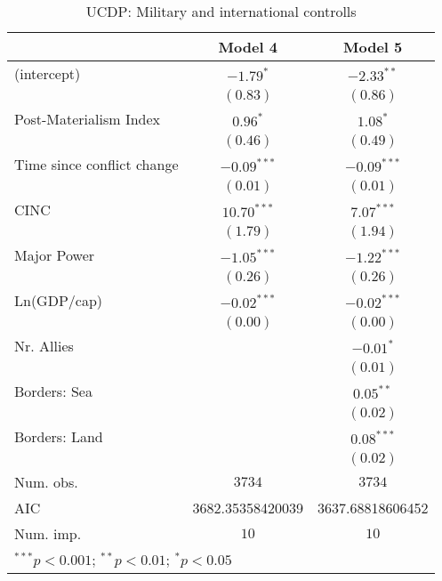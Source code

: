 
\begin{table}
\begin{center}
\begin{tabular}{l c c}
\toprule
 & Model 4 & Model 5 \\
\midrule
(intercept)                & $-1.79^{*}$      & $-2.33^{**}$     \\
                           & $(0.83)$         & $(0.86)$         \\
Post-Materialism Index     & $0.96^{*}$       & $1.08^{*}$       \\
                           & $(0.46)$         & $(0.49)$         \\
Time since conflict change & $-0.09^{***}$    & $-0.09^{***}$    \\
                           & $(0.01)$         & $(0.01)$         \\
CINC                       & $10.70^{***}$    & $7.07^{***}$     \\
                           & $(1.79)$         & $(1.94)$         \\
Major Power                & $-1.05^{***}$    & $-1.22^{***}$    \\
                           & $(0.26)$         & $(0.26)$         \\
Ln(GDP/cap)                & $-0.02^{***}$    & $-0.02^{***}$    \\
                           & $(0.00)$         & $(0.00)$         \\
Nr. Allies                 &                  & $-0.01^{*}$      \\
                           &                  & $(0.01)$         \\
Borders: Sea               &                  & $0.05^{**}$      \\
                           &                  & $(0.02)$         \\
Borders: Land              &                  & $0.08^{***}$     \\
                           &                  & $(0.02)$         \\
\midrule
Num. obs.                  & $3734$           & $3734$           \\
AIC                        & 3682.35358420039 & 3637.68818606452 \\
Num. imp.                  & $10$             & $10$             \\
\bottomrule
\multicolumn{3}{l}{\scriptsize{$^{***}p<0.001$; $^{**}p<0.01$; $^{*}p<0.05$}}
\end{tabular}
\caption{UCDP: Military and international controlls}
\label{UCDP_2_PM}
\end{center}
\end{table}
